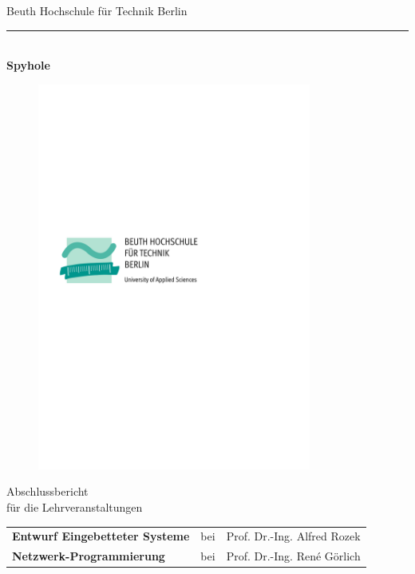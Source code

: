 

\begin{titlepage}
	\begin{center}
		\Large
		Beuth Hochschule für Technik Berlin
		\textcolor{darkBHT}{\rule{\textwidth}{0.2cm}} \\
		\vspace{2 cm}
		\Huge
		\textbf{Spyhole}
		\vspace{2 cm}
		
		\begin{figure}[htbp]
			\centering 
			\includegraphics[width=9cm]{BHT-Logo-Basis.pdf}  
		\end{figure}
		
		\vspace{3cm}
		Abschlussbericht\\
		\Large
		für die Lehrveranstaltungen \\
		\vspace{1cm}
		\begin{tabular}{lcl}
			\textbf{Entwurf Eingebetteter Systeme} & bei & Prof. Dr.-Ing. Alfred Rozek\\
			\textbf{Netzwerk-Programmierung} & bei & Prof. Dr.-Ing. Ren\'e Görlich\\
		\end{tabular} 
		\\
		\vspace{0.8cm}
		\vspace{0.8cm}
		

\end{center}
\end{titlepage}
